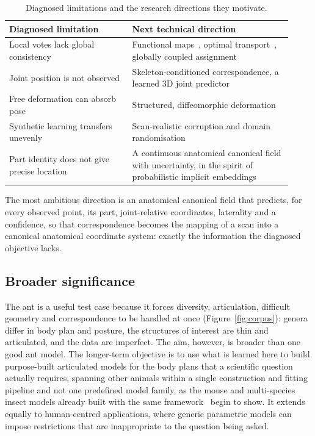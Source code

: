 \begin{table}[!htb]
\centering
\caption{Diagnosed limitations and the research directions they motivate.}
\label{tab:roadmap}
\begin{tabular}{@{}L{0.40\linewidth}L{0.52\linewidth}@{}}
\toprule
\textbf{Diagnosed limitation} & \textbf{Next technical direction}\\
\midrule
Local votes lack global consistency & Functional maps~\cite{fmaps}, optimal
 transport~\cite{ot}, globally coupled assignment\\
Joint position is not observed & Skeleton-conditioned correspondence, a learned 3D
 joint predictor\\
Free deformation can absorb pose & Structured, diffeomorphic deformation\\
Synthetic learning transfers unevenly & Scan-realistic corruption and domain
 randomisation\\
Part identity does not give precise location & A continuous anatomical canonical
 field with uncertainty, in the spirit of probabilistic implicit
 embeddings~\cite{liu2020}\\
\bottomrule
\end{tabular}
\end{table}

The most ambitious direction is an anatomical canonical field that predicts, for
every observed point, its part, joint-relative coordinates, laterality and a
confidence, so that correspondence becomes the mapping of a scan into a canonical
anatomical coordinate system: exactly the information the diagnosed objective lacks.

\subsection{Broader significance}
\label{sec:significance}

The ant is a useful test case because it forces diversity, articulation, difficult geometry
and correspondence to be handled at once (Figure~\ref{fig:corpus}): genera differ in body
plan and posture, the structures of interest are thin and articulated, and the data are
imperfect. The aim, however, is broader than one good ant model. The longer-term objective
is to use what is learned here to build purpose-built articulated models for the body plans
that a scientific question actually requires, spanning other animals within a single
construction and fitting pipeline and not one predefined model family, as the mouse and
multi-species insect models already built with the same framework~\cite{smilify} begin to
show. It extends equally to human-centred applications, where generic parametric models can
impose restrictions that are inappropriate to the question being asked.

